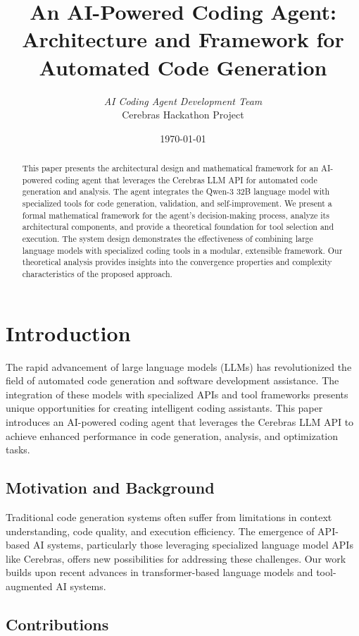\documentclass[11pt,a4paper]{article}
\title{An AI-Powered Coding Agent: Architecture and Framework for Automated Code Generation}
\author{
    \textit{AI Coding Agent Development Team}\\
    Cerebras Hackathon Project
}
\date{\today}
\begin{document}
\maketitle

\begin{abstract}
This paper presents the architectural design and mathematical framework for an AI-powered coding agent that leverages the Cerebras LLM API for automated code generation and analysis. The agent integrates the Qwen-3 32B language model with specialized tools for code generation, validation, and self-improvement. We present a formal mathematical framework for the agent's decision-making process, analyze its architectural components, and provide a theoretical foundation for tool selection and execution. The system design demonstrates the effectiveness of combining large language models with specialized coding tools in a modular, extensible framework. Our theoretical analysis provides insights into the convergence properties and complexity characteristics of the proposed approach.
\end{abstract}

\section{Introduction}

The rapid advancement of large language models (LLMs) has revolutionized the field of automated code generation and software development assistance. The integration of these models with specialized APIs and tool frameworks presents unique opportunities for creating intelligent coding assistants. This paper introduces an AI-powered coding agent that leverages the Cerebras LLM API to achieve enhanced performance in code generation, analysis, and optimization tasks.

\subsection{Motivation and Background}

Traditional code generation systems often suffer from limitations in context understanding, code quality, and execution efficiency. The emergence of API-based AI systems, particularly those leveraging specialized language model APIs like Cerebras, offers new possibilities for addressing these challenges. Our work builds upon recent advances in transformer-based language models and tool-augmented AI systems.

\subsection{Contributions}
\end{document}
